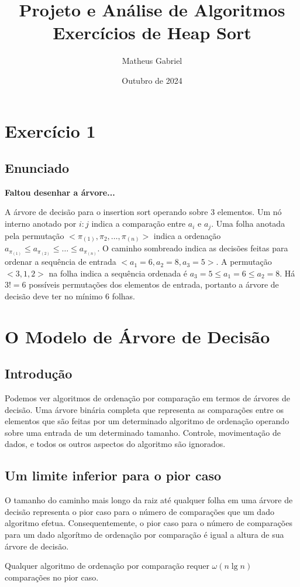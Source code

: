 \documentclass{article}
\title{Projeto e Análise de Algoritmos \\
\large Exercícios de Heap Sort}
\author{Matheus Gabriel}
\date{Outubro de 2024}
\begin{document}
\maketitle

\section{Exercício 1}

\subsection{Enunciado}

\textbf{Faltou desenhar a árvore...}

A árvore de decisão para o insertion sort operando sobre 3 elementos. Um nó interno anotado por $i:j$ indica a comparação entre $a_i$ e $a_j$. Uma folha anotada pela permutação $<\pi_{(1)},\pi_2, \dots, \pi_{(n)} >$ indica a ordenação $a_{\pi_{(1)}} \leq a_{\pi_{(2)}} \leq \dots \leq a_{\pi_{(n)}}$. O caminho sombreado indica as decisões feitas para ordenar a sequência de entrada $<a_1=6,a_2=8,a_3=5>$. A permutação $<3,1,2>$ na folha indica a sequência ordenada é $a_3 = 5 \leq a_1 = 6 \leq a_2 = 8$. Há $3! = 6$ possíveis permutações dos elementos de entrada, portanto a árvore de decisão deve ter no mínimo 6 folhas.

\section{O Modelo de Árvore de Decisão}

\subsection{Introdução}

Podemos ver algoritmos de ordenação por comparação em termos de árvores de decisão. Uma árvore binária completa que representa as comparações entre os elementos que são feitas por um determinado algoritmo de ordenação operando sobre uma entrada de um determinado tamanho. Controle, movimentação de dados, e todos os outros aspectos do algoritmo são ignorados.

\subsection{Um limite inferior para o pior caso}

O tamanho do caminho mais longo da raiz até qualquer folha  em uma árvore de decisão representa o pior caso para o número de comparações que um dado algoritmo efetua. Consequentemente, o pior caso para o número de comparações para um dado algorítmo de ordenação por comparação é igual a altura de  sua árvore de decisão.

\begin{tcolorbox}[
    colback=blue!5,
    colframe=blue!80!black,
    title=Teorema,
    fonttitle=\bfseries,
    enhanced,
    boxrule=0.8mm,
    left=5mm,
    right=5mm,
    top=5mm,
    bottom=5mm
]
Qualquer algoritmo de ordenação por comparação requer $\omega (n \lg n)$ comparações no pior caso.
\end{tcolorbox}
\end{document}
